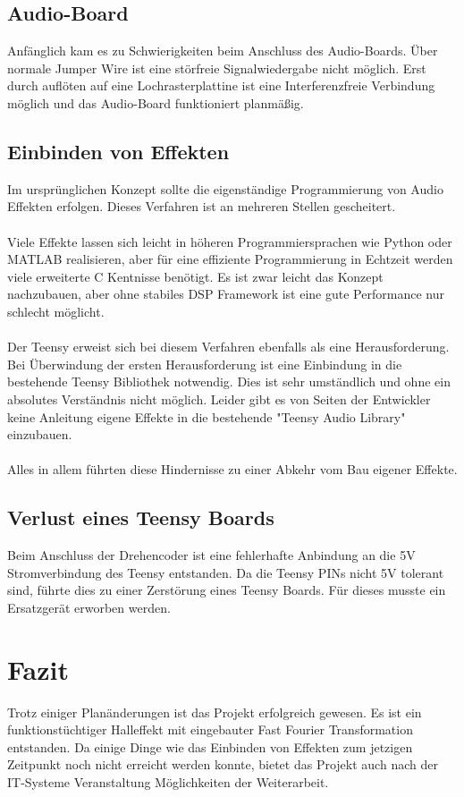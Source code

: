 \documentclass[12pt]{article}
\begin{document}
\subsection{Audio-Board}
Anfänglich kam es zu Schwierigkeiten beim Anschluss des Audio-Boards. Über normale Jumper Wire ist eine störfreie Signalwiedergabe nicht möglich. 
Erst durch auflöten auf eine Lochrasterplattine ist eine Interferenzfreie Verbindung möglich und das Audio-Board funktioniert planmäßig.
\subsection{Einbinden von Effekten}
Im ursprünglichen Konzept sollte die eigenständige Programmierung von Audio Effekten erfolgen. 
Dieses Verfahren ist an mehreren Stellen gescheitert. 
\\
\\
Viele Effekte lassen sich leicht in höheren Programmiersprachen
wie Python oder MATLAB realisieren, aber für eine effiziente Programmierung in Echtzeit werden viele erweiterte C Kentnisse benötigt. 
Es ist zwar leicht das Konzept nachzubauen, aber ohne stabiles DSP Framework ist eine gute 
Performance nur schlecht möglicht. 
\\
\\
Der Teensy erweist sich bei diesem Verfahren ebenfalls als eine Herausforderung. Bei Überwindung der ersten Herausforderung 
ist eine Einbindung in die bestehende Teensy Bibliothek notwendig. Dies ist sehr umständlich und ohne ein absolutes Verständnis nicht möglich. 
Leider gibt es von Seiten der Entwickler keine Anleitung eigene Effekte in die bestehende "Teensy Audio Library" einzubauen. 
\\
\\
Alles in allem führten diese Hindernisse zu einer Abkehr vom Bau eigener Effekte.  
\subsection{Verlust eines Teensy Boards}
Beim Anschluss der Drehencoder ist eine fehlerhafte Anbindung an die 5V Stromverbindung des Teensy entstanden. 
Da die Teensy PINs nicht 5V tolerant sind, führte dies zu einer Zerstörung eines Teensy Boards.
Für dieses musste ein Ersatzgerät erworben werden. 

  
\section{Fazit}
Trotz einiger Planänderungen ist das Projekt erfolgreich gewesen. Es ist ein funktionstüchtiger Halleffekt mit eingebauter Fast Fourier Transformation
entstanden.
Da einige Dinge wie das Einbinden von Effekten zum jetzigen Zeitpunkt noch nicht erreicht werden konnte, bietet das Projekt auch nach der IT-Systeme 
Veranstaltung Möglichkeiten der Weiterarbeit.  
\end{document}
